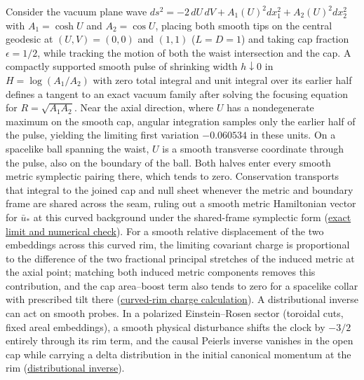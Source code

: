 \documentclass[10pt,a4paper]{article}
\numberwithin{equation}{section}
\newcommand{\repo}[2]{\href{https://github.com/sprajs/quantum-gravity/blob/main/#1}{#2}}
\begin{document}
Consider the vacuum plane wave $ds^2=-2\,dU\,dV+A_1(U)^2dx_1^2+A_2(U)^2dx_2^2$ with $A_1=\cosh U$ and $A_2=\cos U$, placing both smooth tips on the central geodesic at $(U,V)=(0,0)$ and $(1,1)$ ($L=D=1$) and taking cap fraction $\epsilon=1/2$, while tracking the motion of both the waist intersection and the cap.
A compactly supported smooth pulse of shrinking width $h\downarrow 0$ in $H=\log(A_1/A_2)$ with zero total integral and unit integral over its earlier half defines a tangent to an exact vacuum family after solving the focusing equation for $R=\sqrt{A_1A_2}$.
Near the axial direction, where $U$ has a nondegenerate maximum on the smooth cap, angular integration samples only the earlier half of the pulse, yielding the limiting first variation $-0.060534$ in these units.
On a spacelike ball spanning the waist, $U$ is a smooth transverse coordinate through the pulse, also on the boundary of the ball. Both halves enter every smooth metric symplectic pairing there, which tends to zero.
Conservation transports that integral to the joined cap and null sheet whenever the metric and boundary frame are shared across the seam, ruling out a smooth metric Hamiltonian vector for $\bar u_*$ at this curved background under the shared-frame symplectic form (\repo{audit/joint-focal.md}{exact limit and numerical check}).
For a smooth relative displacement of the two embeddings across this curved rim, the limiting covariant charge is proportional to the difference of the two fractional principal stretches of the induced metric at the axial point; matching both induced metric components removes this contribution, and the cap area--boost term also tends to zero for a spacelike collar with prescribed tilt there (\repo{audit/match-curved.md}{curved-rim charge calculation}).
A distributional inverse can act on smooth probes. In a polarized Einstein--Rosen sector (toroidal cuts, fixed areal embeddings), a smooth physical disturbance shifts the clock by $-3/2$ entirely through its rim term, and the causal Peierls inverse vanishes in the open cap while carrying a delta distribution in the initial canonical momentum at the rim (\repo{audit/joint-peierls.md}{distributional inverse}).
\end{document}
